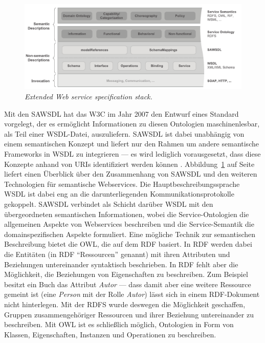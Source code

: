 \begin{figure}[ht]
\centering
\parbox{\textwidth}{
    \includegraphics[width=\textwidth]{media/Extended-Web-Service-Specification-Stack.pdf}
    \caption{\emph{Extended Web service specification stack.} \cite[S.63]{ky-sawsdl}}
    \label{f:ewsss}
}
\end{figure}

\label{l:sawsdl}Mit den \ac{SAWSDL} hat das \ac{W3C} im Jahr 2007 den Entwurf eines Standard vorgelegt, der es ermöglicht Informationen zu diesen Ontologien maschinenlesbar, als Teil einer \ac{WSDL}-Datei, auszuliefern. \ac{SAWSDL} ist dabei unabhängig von einem semantischen Konzept und liefert nur den Rahmen um andere semantische Frameworks in \ac{WSDL} zu integrieren --- es wird lediglich vorausgesetzt, dass diese Konzepte anhand von URIs identifiziert werden können \cite[S.61]{ky-sawsdl}. Abbildung~\ref{f:ewsss} auf Seite~\pageref{f:ewsss} liefert einen Überblick über den Zusammenhang von \ac{SAWSDL} und den weiteren Technologien für semantische Webservices. Die Hauptbeschreibungssprache \ac{WSDL} ist dabei eng an die darunterliegenden Kommunikationsprotokolle gekoppelt. \ac{SAWSDL} verbindet als Schicht darüber \ac{WSDL} mit den übergeordneten semantischen Informationen, wobei die Service-Ontologien die allgemeinen Aspekte von Webservices beschreiben und die Service-Semantik die domainspezifischen Aspekte formuliert. Eine mögliche Technik zur semantischen Beschreibung bietet die \ac{OWL}, die auf dem \ac{RDF} basiert. In \ac{RDF} werden dabei die Entitäten (in \ac{RDF} "`Ressourcen"' genannt) mit ihren Attributen und Beziehungen untereinander syntaktisch beschrieben. In \ac{RDF} fehlt aber die Möglichkeit, die Beziehungen von Eigenschaften zu beschreiben. Zum Beispiel besitzt ein Buch das Attribut \emph{Autor} --- dass damit aber eine weitere Ressource gemeint ist (eine \emph{Person} mit der Rolle \emph{Autor}) lässt sich in einem \ac{RDF}-Dokument nicht hinterlegen. Mit der \ac{RDFS} wurde deswegen die Möglichkeit geschaffen, Gruppen zusammengehöriger Ressourcen und ihrer Beziehung untereinander zu beschreiben. Mit \ac{OWL} ist es schließlich möglich, Ontologien in Form von Klassen, Eigenschaften, Instanzen und Operationen zu beschreiben. 

